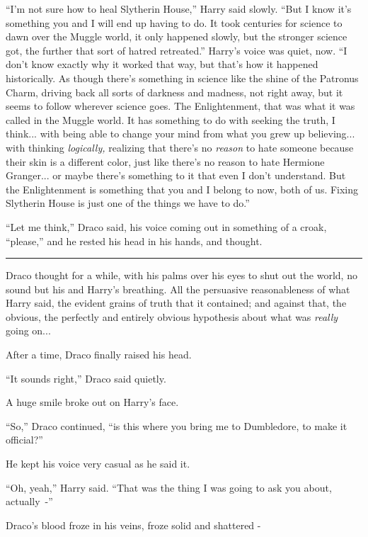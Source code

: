 ``I'm not sure how to heal Slytherin House,'' Harry said slowly. ``But I know it's something you and I will end up having to do. It took centuries for science to dawn over the Muggle world, it only happened slowly, but the stronger science got, the further that sort of hatred retreated.'' Harry's voice was quiet, now. ``I don't know exactly why it worked that way, but that's how it happened historically. As though there's something in science like the shine of the Patronus Charm, driving back all sorts of darkness and madness, not right away, but it seems to follow wherever science goes. The Enlightenment, that was what it was called in the Muggle world. It has something to do with seeking the truth, I think... with being able to change your mind from what you grew up believing... with thinking \emph{logically,} realizing that there's no \emph{reason} to hate someone because their skin is a different color, just like there's no reason to hate Hermione Granger... or maybe there's something to it that even I don't understand. But the Enlightenment is something that you and I belong to now, both of us. Fixing Slytherin House is just one of the things we have to do.''

``Let me think,'' Draco said, his voice coming out in something of a croak, ``please,'' and he rested his head in his hands, and thought.

\begin{center}\rule{3in}{0.4pt}\end{center}

Draco thought for a while, with his palms over his eyes to shut out the world, no sound but his and Harry's breathing. All the persuasive reasonableness of what Harry said, the evident grains of truth that it contained; and against that, the obvious, the perfectly and entirely obvious hypothesis about what was \emph{really} going on...

After a time, Draco finally raised his head.

``It sounds right,'' Draco said quietly.

A huge smile broke out on Harry's face.

``So,'' Draco continued, ``is this where you bring me to Dumbledore, to make it official?''

He kept his voice very casual as he said it.

``Oh, yeah,'' Harry said. ``That was the thing I was going to ask you about, actually~-''

Draco's blood froze in his veins, froze solid and shattered -

